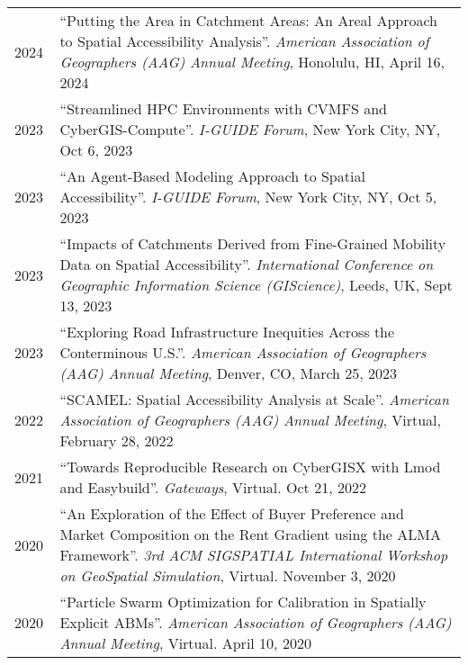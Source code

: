 \documentclass{acmcv}
\begin{document}
    \begin{longtable}{p{0.1\linewidth} p{0.9\linewidth}}
        2024 & ``Putting the Area in Catchment Areas: An Areal Approach to Spatial Accessibility Analysis''. \textit{American Association of Geographers (AAG) Annual Meeting}, Honolulu, HI, April 16, 2024\\

        2023 & ``Streamlined HPC Environments with CVMFS and CyberGIS-Compute''. \textit{I-GUIDE Forum}, New York City, NY, Oct 6, 2023\\

        2023 & ``An Agent-Based Modeling Approach to Spatial Accessibility''. \textit{I-GUIDE Forum}, New York City, NY, Oct 5, 2023\\

        2023 & ``Impacts of Catchments Derived from Fine-Grained Mobility Data on Spatial Accessibility''. \textit{International Conference on Geographic Information Science (GIScience)}, Leeds, UK, Sept 13, 2023\\

        2023 & ``Exploring Road Infrastructure Inequities Across the Conterminous U.S.''. \textit{American Association of Geographers (AAG) Annual Meeting}, Denver, CO, March 25, 2023\\

        2022 & ``SCAMEL: Spatial Accessibility Analysis at Scale''. \textit{American Association of Geographers (AAG) Annual Meeting}, Virtual, February 28, 2022\\

        2021 & ``Towards Reproducible Research on CyberGISX with Lmod and Easybuild''. \textit{Gateways}, Virtual. Oct 21, 2022\\

        2020 & ``An Exploration of the Effect of Buyer Preference and Market Composition on the Rent Gradient using the ALMA Framework''. \textit{3rd ACM SIGSPATIAL International Workshop on GeoSpatial Simulation}, Virtual. November 3, 2020 \\

        2020 & ``Particle Swarm Optimization for Calibration in Spatially Explicit ABMs''. \textit{American Association of Geographers (AAG) Annual Meeting}, Virtual. April 10, 2020 \\



\end{longtable}
\end{document}
